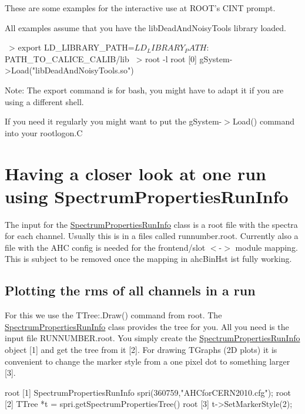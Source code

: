 These are some examples for the interactive use at ROOT's CINT prompt.

All examples assume that you have the libDeadAndNoisyTools library loaded. 
\begin{DoxyCode}
~> export LD_LIBRARY_PATH=$LD_LIBRARY_PATH:${PATH_TO_CALICE_CALIB}/lib
~> root -l
root [0] gSystem->Load("libDeadAndNoisyTools.so")
\end{DoxyCode}


Note: The {\ttfamily export} command is for bash, you might have to adapt it if you are using a different shell.

If you need it regularly you might want to put the {\ttfamily gSystem-\/$>$Load()} command into your rootlogon.C\hypertarget{examples_usingSpectrumPropertiesRunInfo}{}\section{Having a closer look at one run using SpectrumPropertiesRunInfo}\label{examples_usingSpectrumPropertiesRunInfo}
The input for the \hyperlink{class_spectrum_properties_run_info}{SpectrumPropertiesRunInfo} class is a root file with the spectra for each channel. Usually this is in a files called {\ttfamily runnumber.root}. Currently also a file with the AHC config is needed for the frontend/slot $<$-\/$>$ module mapping. This is subject to be removed once the mapping in ahcBinHst ist fully working.\hypertarget{examples_plotRun}{}\subsection{Plotting the rms of all channels in a run}\label{examples_plotRun}
For this we use the TTree:.Draw() command from root. The \hyperlink{class_spectrum_properties_run_info}{SpectrumPropertiesRunInfo} class provides the tree for you. All you need is the input file {\ttfamily RUNNUMBER.root}. You simply create the \hyperlink{class_spectrum_properties_run_info}{SpectrumPropertiesRunInfo} object \mbox{[}1\mbox{]} and get the tree from it \mbox{[}2\mbox{]}. For drawing TGraphs (2D plots) it is convenient to change the marker style from a one pixel dot to something larger \mbox{[}3\mbox{]}. 
\begin{DoxyCode}
root [1] SpectrumPropertiesRunInfo spri(360759,"AHCforCERN2010.cfg");
root [2] TTree *t = spri.getSpectrumPropertiesTree()
root [3] t->SetMarkerStyle(2);
\end{DoxyCode}


